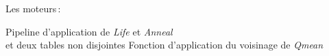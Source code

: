 \documentclass[a4paper,dvips]{slides}
\renewcommand{\arule}[1]{\emph{\mbox{#1}}} %
\newenvironment{mynote}{\begin{note}\begin{scriptsize}}{\end{scriptsize}\end{note}}
\newcommand{\mytitle}[1]{\begin{center}\begin{large}#1\end{large}\end{center}}
\begin{document}


\begin{slide}
  \mytitle{Les moteurs\,:}
  {Pipeline d'application de \arule{Life} et \arule{Anneal}\\
    et deux tables non disjointes}
  {Fonction d'application du voisinage de \arule{Qmean}}
\end{slide}
\end{document}
